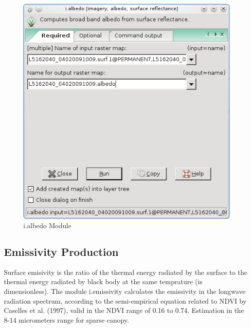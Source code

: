 \begin{figure}[htbp]
   \centering
   \includegraphics[scale=0.4]{gipe020.png}
   \caption{i.albedo Module}
   \label{fig:gipe020}
\end{figure}

\subsection{Emissivity Production}
Surface emisivity is the ratio of the thermal energy radiated by the surface to the thermal energy  radiated by black body at the same temprature (is dimensionless).\newline 
The module i.emissivity calculates the emissivity in the longwave radiation spectrum, according to the semi-empirical equation related to NDVI by Caselles et al. (1997), valid in the NDVI range of 0.16 to 0.74. Estimation in the 8-14 micrometers range for sparse canopy.\newline

